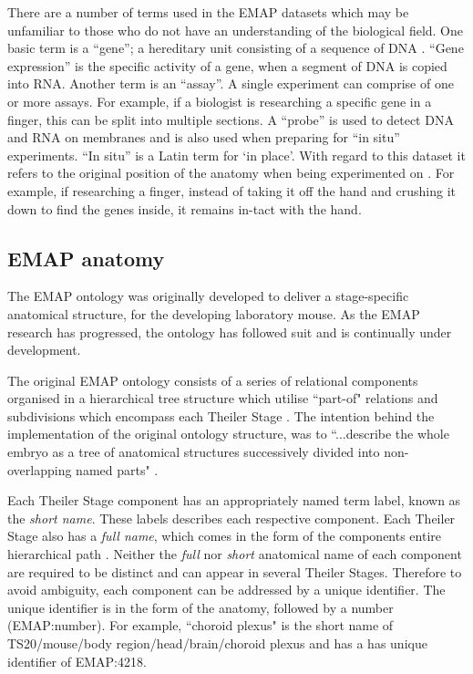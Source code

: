 There are a number of terms used in the EMAP datasets which may be unfamiliar to those who do not have an understanding of the biological field. One basic term is a ``gene''; a hereditary unit consisting of a sequence of DNA \cite{emap}. ``Gene expression'' is the specific activity of a gene, when a segment of DNA is copied into RNA. Another term is an ``assay''. A single experiment can comprise of one or more assays. For example, if a biologist is researching a specific gene in a finger, this can be split into multiple sections. A ``probe'' is used to detect DNA and RNA on membranes and is also used when preparing for ``in situ'' experiments. ``In situ'' is a Latin term for `in place'. With regard to this dataset it refers to the original position of the anatomy when being experimented on \cite{emap}. For example, if researching a finger, instead of taking it off the hand and crushing it down to find the genes inside, it remains in-tact with the hand.

\subsection{EMAP anatomy}
The EMAP ontology was originally developed to deliver a stage-specific anatomical structure, for the developing laboratory mouse. As the EMAP research has progressed, the ontology has followed suit and is continually under development.

The original EMAP ontology consists of a series of relational components organised in a hierarchical tree structure which utilise ``part-of" relations and subdivisions which encompass each Theiler Stage \cite{emap}. The intention behind the implementation of the original ontology structure, was to ``...describe the whole embryo as a tree of anatomical structures successively divided into non-overlapping named parts" \cite{emap}.

Each Theiler Stage component has an appropriately named term label, known as the \textit{short name}. These labels describes each respective component. Each Theiler Stage also has a \textit{full name}, which comes in the form of the components entire hierarchical path \cite{emap}. Neither the \textit{full} nor \textit{short} anatomical name of each component are required to be distinct and can appear in several Theiler Stages. Therefore to avoid ambiguity, each component can be addressed by a unique identifier. The unique identifier is in the form of the anatomy, followed by a number (EMAP:number). For example, ``choroid plexus" is the short name of TS20/mouse/body region/head/brain/choroid plexus and has a has unique identifier of EMAP:4218.

